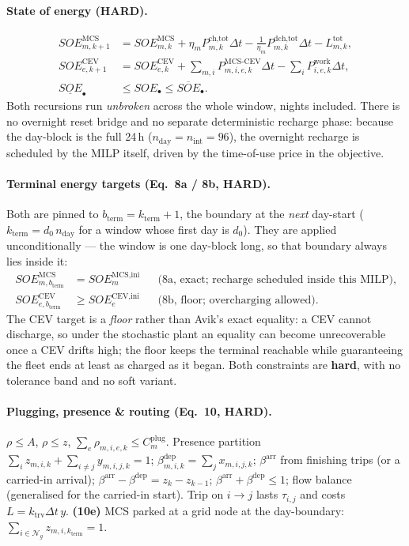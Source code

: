 \documentclass[11pt]{article}
\newcommand{\dt}{\Delta t}
\begin{document}
\paragraph{State of energy (HARD).}
\begin{align}
SOE^{\text{MCS}}_{m,k+1}&=SOE^{\text{MCS}}_{m,k}+\eta_m P^{\text{ch,tot}}_{m,k}\dt-\tfrac{1}{\eta_m}P^{\text{dch,tot}}_{m,k}\dt-L^{\text{tot}}_{m,k},\\
SOE^{\text{CEV}}_{e,k+1}&=SOE^{\text{CEV}}_{e,k}+\textstyle\sum_{m,i}P^{\text{MCS-CEV}}_{m,i,e,k}\dt-\sum_i P^{\text{work}}_{i,e,k}\dt,\\
\underline{SOE}_\bullet&\le SOE_\bullet\le\overline{SOE}_\bullet .
\end{align}
Both recursions run \emph{unbroken} across the whole window, nights included. There is no
overnight reset bridge and no separate deterministic recharge phase: because the day-block is the
full 24\,h ($n_{\text{day}}=n_{\text{int}}=96$), the overnight recharge is scheduled by the MILP
itself, driven by the time-of-use price in the objective.

\paragraph{Terminal energy targets (Eq.\ 8a / 8b, HARD).}
Both are pinned to $b_{\text{term}}=k_{\text{term}}+1$, the boundary at the \emph{next} day-start
($k_{\text{term}}=d_0\,n_{\text{day}}$ for a window whose first day is $d_0$). They are applied
unconditionally --- the window is one day-block long, so that boundary always lies inside it:
\begin{align}
SOE^{\text{MCS}}_{m,b_{\text{term}}}&= SOE^{\text{MCS,ini}}_m && \text{(8a, exact; recharge scheduled inside this MILP)},\\
SOE^{\text{CEV}}_{e,b_{\text{term}}}&\ge SOE^{\text{CEV,ini}}_e && \text{(8b, floor; overcharging allowed)}.
\end{align}
The CEV target is a \emph{floor} rather than Avik's exact equality: a CEV cannot discharge, so
under the stochastic plant an equality can become unrecoverable once a CEV drifts high; the floor
keeps the terminal reachable while guaranteeing the fleet ends at least as charged as it began.
Both constraints are \textbf{hard}, with no tolerance band and no soft variant.

\paragraph{Plugging, presence \& routing (Eq.\ 10, HARD).}
$\rho\le A$, $\rho\le z$, $\sum_e \rho_{m,i,e,k}\le C^{\text{plug}}_m$. Presence partition
$\sum_i z_{m,i,k}+\sum_{i\ne j}y_{m,i,j,k}=1$; $\beta^{\text{dep}}_{m,i,k}=\sum_j x_{m,i,j,k}$;
$\beta^{\text{arr}}$ from finishing trips (or a carried-in arrival);
$\beta^{\text{arr}}-\beta^{\text{dep}}=z_k-z_{k-1}$; $\beta^{\text{arr}}+\beta^{\text{dep}}\le1$;
flow balance (generalised for the carried-in start). Trip on $i\!\to\!j$ lasts $\tau_{i,j}$ and
costs $L=k_{\text{trv}}\dt\,y$. \textbf{(10e)} MCS parked at a grid node at the day-boundary:
$\sum_{i\in\mathcal{N}_g}z_{m,i,k_{\text{term}}}=1$.
\end{document}
